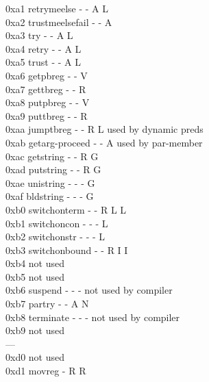 \documentclass[11pt]{article}
\begin{document}
\begin{tabbing}
0xa1  \> retrymeelse	\> - \> - \> A \> L \>   \>		\\
0xa2  \> trustmeelsefail\> - \> - \> A \>   \>   \>		\\
0xa3  \> try		\> - \> - \> A \> L \>   \>		\\
0xa4  \> retry		\> - \> - \> A \> L \>   \>		\\
0xa5  \> trust		\> - \> - \> A \> L \>   \>		\\
0xa6  \> getpbreg	\> - \> - \> V \>   \>   \>		\\
0xa7  \> gettbreg	\> - \> - \> R \>   \>	 \>		\\
0xa8  \> putpbreg	\> - \> - \> V \>   \>   \>		\\
0xa9  \> puttbreg	\> - \> - \> R \>   \>	 \>		\\
0xaa  \> jumptbreg	\> - \> - \> R \> L \>   \> used by dynamic preds\\
0xab  \> getarg-proceed \> - \> - \> A \>   \>   \> used by par-member	\\
0xac  \> getstring	\> - \> - \> R \> G \>   \>		\\
0xad  \> putstring	\> - \> - \> R \> G \>   \>		\\
0xae  \> unistring	\> - \> - \> - \> G \>   \>		\\
0xaf  \> bldstring	\> - \> - \> - \> G \>   \>		\\
0xb0  \> switchonterm	\> - \> - \> R \> L \> L \>		\\
0xb1  \> switchoncon	\> - \> - \> - \> L \>   \>		\\
0xb2  \> switchonstr	\> - \> - \> - \> L \>   \>		\\
0xb3  \> switchonbound	\> - \> - \> R \> I \> I \>		\\
0xb4  \>		\>   \>   \>   \>   \>	 \> not used	\\
0xb5  \>		\>   \>   \>   \>   \>   \> not used	\\
0xb6  \> suspend	\> - \> - \> - \>   \>   \> not used by compiler \\
0xb7  \> partry		\> - \> - \> A \> N \>   \>		\\
0xb8  \> terminate	\> - \> - \> - \>   \>   \> not used by compiler \\
0xb9  \>		\>   \>   \>   \>   \>	 \> not used	\\
---   \>		\>   \>   \>   \>   \>   \>		\\
0xd0  \>		\>   \>   \>   \>   \>   \> not used	\\
0xd1  \> movreg		\> - \> R \> R \>   \>	 \>		\\

\end{tabbing}
\end{document}
